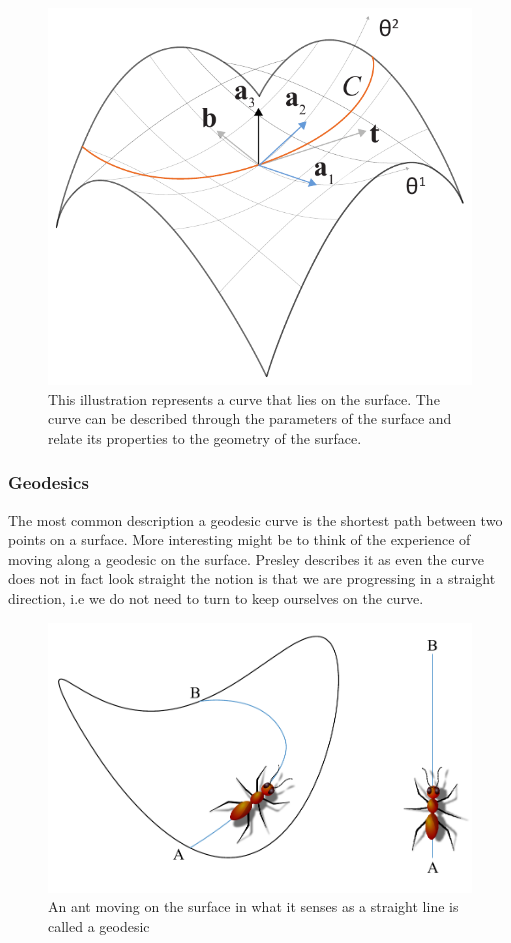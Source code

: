 \begin{figure}[H]
\centering
\includegraphics[width=0.7\linewidth ]{figure/Theory/CurveOnSurface.pdf}
\caption{This illustration represents a curve that lies on the surface. The curve can be described through the parameters of the surface and relate its properties to the geometry of the surface. }
\end{figure}



\subsubsection{Geodesics} \label{sec:geodesics}

The most common description a geodesic curve is the shortest path between two points on a surface. More interesting might be to think of the experience of moving along a geodesic on the surface. Presley describes it as even the curve does not in fact look straight the notion is that we are progressing in a straight direction, i.e we do not need to turn to keep ourselves on the curve. 


\begin{figure}[H]
\centering
\includegraphics[width=0.7\linewidth ]{figure/Theory/Geodesics.pdf}
\caption{An ant moving on the surface in what it senses as a straight line is called a geodesic }
\end{figure}

